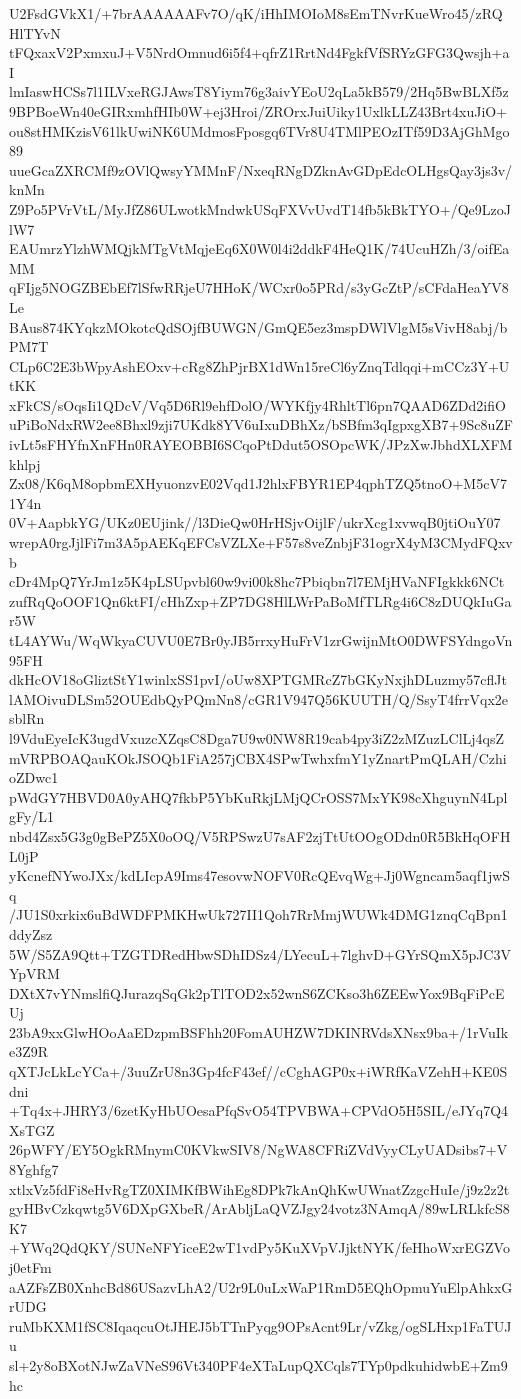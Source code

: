 U2FsdGVkX1/+7brAAAAAAFv7O/qK/iHhIMOIoM8sEmTNvrKueWro45/zRQHlTYvN
tFQxaxV2PxmxuJ+V5NrdOmnud6i5f4+qfrZ1RrtNd4FgkfVfSRYzGFG3Qwsjh+aI
lmIaswHCSs7l1ILVxeRGJAwsT8Yiym76g3aivYEoU2qLa5kB579/2Hq5BwBLXf5z
9BPBoeWn40eGIRxmhfHIb0W+ej3Hroi/ZROrxJuiUiky1UxlkLLZ43Brt4xuJiO+
ou8stHMKzisV61lkUwiNK6UMdmosFposgq6TVr8U4TMlPEOzITf59D3AjGhMgo89
uueGcaZXRCMf9zOVlQwsyYMMnF/NxeqRNgDZknAvGDpEdcOLHgsQay3js3v/knMn
Z9Po5PVrVtL/MyJfZ86ULwotkMndwkUSqFXVvUvdT14fb5kBkTYO+/Qe9LzoJlW7
EAUmrzYlzhWMQjkMTgVtMqjeEq6X0W0l4i2ddkF4HeQ1K/74UcuHZh/3/oifEaMM
qFIjg5NOGZBEbEf7lSfwRRjeU7HHoK/WCxr0o5PRd/s3yGcZtP/sCFdaHeaYV8Le
BAus874KYqkzMOkotcQdSOjfBUWGN/GmQE5ez3mspDWlVlgM5sVivH8abj/bPM7T
CLp6C2E3bWpyAshEOxv+cRg8ZhPjrBX1dWn15reCl6yZnqTdlqqi+mCCz3Y+UtKK
xFkCS/sOqsIi1QDcV/Vq5D6Rl9ehfDolO/WYKfjy4RhltTl6pn7QAAD6ZDd2ifiO
uPiBoNdxRW2ee8Bhxl9zji7UKdk8YV6uIxuDBhXz/bSBfm3qIgpxgXB7+9Sc8uZF
ivLt5sFHYfnXnFHn0RAYEOBBI6SCqoPtDdut5OSOpcWK/JPzXwJbhdXLXFMkhlpj
Zx08/K6qM8opbmEXHyuonzvE02Vqd1J2hlxFBYR1EP4qphTZQ5tnoO+M5cV71Y4n
0V+AapbkYG/UKz0EUjink//l3DieQw0HrHSjvOijlF/ukrXcg1xvwqB0jtiOuY07
wrepA0rgJjlFi7m3A5pAEKqEFCsVZLXe+F57s8veZnbjF31ogrX4yM3CMydFQxvb
cDr4MpQ7YrJm1z5K4pLSUpvbl60w9vi00k8hc7Pbiqbn7l7EMjHVaNFIgkkk6NCt
zufRqQoOOF1Qn6ktFI/cHhZxp+ZP7DG8HlLWrPaBoMfTLRg4i6C8zDUQkIuGar5W
tL4AYWu/WqWkyaCUVU0E7Br0yJB5rrxyHuFrV1zrGwijnMtO0DWFSYdngoVn95FH
dkHcOV18oGliztStY1winlxSS1pvI/oUw8XPTGMRcZ7bGKyNxjhDLuzmy57cflJt
lAMOivuDLSm52OUEdbQyPQmNn8/cGR1V947Q56KUUTH/Q/SsyT4frrVqx2esblRn
l9VduEyeIcK3ugdVxuzcXZqsC8Dga7U9w0NW8R19cab4py3iZ2zMZuzLClLj4qsZ
mVRPBOAQauKOkJSOQb1FiA257jCBX4SPwTwhxfmY1yZnartPmQLAH/CzhioZDwc1
pWdGY7HBVD0A0yAHQ7fkbP5YbKuRkjLMjQCrOSS7MxYK98cXhguynN4LplgFy/L1
nbd4Zsx5G3g0gBePZ5X0oOQ/V5RPSwzU7sAF2zjTtUtOOgODdn0R5BkHqOFHL0jP
yKcnefNYwoJXx/kdLIcpA9Ims47esovwNOFV0RcQEvqWg+Jj0Wgncam5aqf1jwSq
/JU1S0xrkix6uBdWDFPMKHwUk727II1Qoh7RrMmjWUWk4DMG1znqCqBpn1ddyZsz
5W/S5ZA9Qtt+TZGTDRedHbwSDhIDSz4/LYecuL+7lghvD+GYrSQmX5pJC3VYpVRM
DXtX7vYNmslfiQJurazqSqGk2pTlTOD2x52wnS6ZCKso3h6ZEEwYox9BqFiPcEUj
23bA9xxGlwHOoAaEDzpmBSFhh20FomAUHZW7DKINRVdsXNsx9ba+/1rVuIke3Z9R
qXTJcLkLcYCa+/3uuZrU8n3Gp4fcF43ef//cCghAGP0x+iWRfKaVZehH+KE0Sdni
+Tq4x+JHRY3/6zetKyHbUOesaPfqSvO54TPVBWA+CPVdO5H5SIL/eJYq7Q4XsTGZ
26pWFY/EY5OgkRMnymC0KVkwSIV8/NgWA8CFRiZVdVyyCLyUADsibs7+V8Yghfg7
xtlxVz5fdFi8eHvRgTZ0XIMKfBWihEg8DPk7kAnQhKwUWnatZzgcHuIe/j9z2z2t
gyHBvCzkqwtg5V6DXpGXbeR/ArAbljLaQVZJgy24votz3NAmqA/89wLRLkfcS8K7
+YWq2QdQKY/SUNeNFYiceE2wT1vdPy5KuXVpVJjktNYK/feHhoWxrEGZVoj0etFm
aAZFsZB0XnhcBd86USazvLhA2/U2r9L0uLxWaP1RmD5EQhOpmuYuElpAhkxGrUDG
ruMbKXM1fSC8IqaqcuOtJHEJ5bTTnPyqg9OPsAcnt9Lr/vZkg/ogSLHxp1FaTUJu
sl+2y8oBXotNJwZaVNeS96Vt340PF4eXTaLupQXCqls7TYp0pdkuhidwbE+Zm9hc
